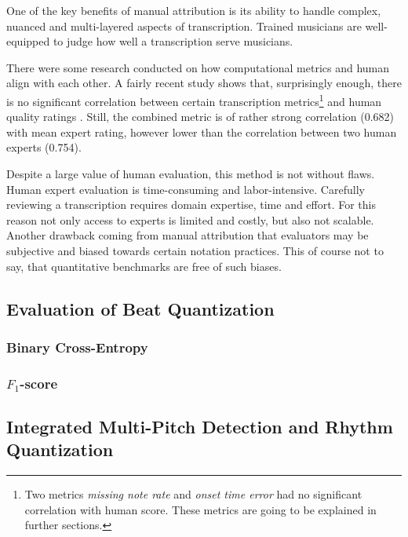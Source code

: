 One of the key benefits of manual attribution is its ability to handle complex, nuanced and multi-layered aspects of transcription. Trained musicians are well-equipped to judge how well a transcription serve musicians.

There were some research conducted on how computational metrics and human align with each other. A fairly recent study shows that, surprisingly enough, there is no significant correlation between certain transcription metrics\footnote{Two metrics \emph{missing note rate} and \emph{onset time error} had no significant correlation with human score. These metrics are going to be explained in further sections.} and human quality ratings \cite{Holzapfel2021}. Still, the combined metric is of rather strong correlation (0.682) with mean expert rating, however lower than the correlation between two human experts (0.754).

Despite a large value of human evaluation, this method is not without flaws. Human expert evaluation is time-consuming and labor-intensive. Carefully reviewing a transcription requires domain expertise, time and effort. For this reason not only access to experts is limited and costly, but also not scalable. Another drawback coming from manual attribution that evaluators may be subjective and biased towards certain notation practices. This of course not to say, that quantitative benchmarks are free of such biases.

\subsection{Evaluation of Beat Quantization}

\missing

\subsubsection{Binary Cross-Entropy}

\missing

\subsubsection{$F_1$-score}

\missing

\subsection{Integrated Multi-Pitch Detection and Rhythm Quantization}


